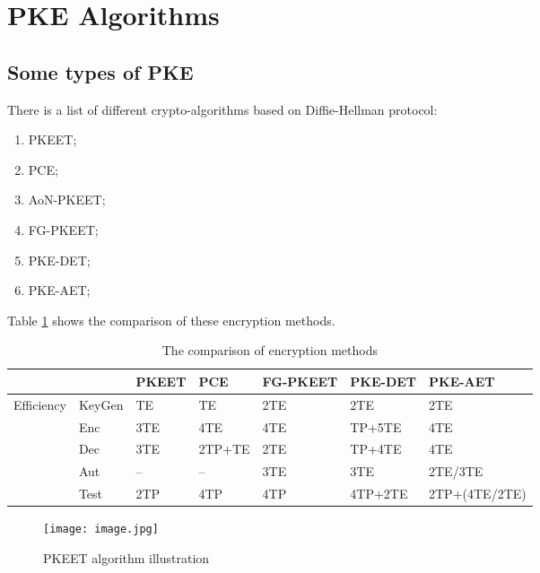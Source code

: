 \documentclass[12pt]{article}
\begin{document}
\tableofcontents
\newpage
\section{PKE Algorithms}
\subsection{Some types of PKE} 
 
 

There is a list of different crypto-algorithms based on Diffie-Hellman protocol:
\newline
\begin{enumerate}
    \item PKEET;
    \item PCE;
    \item AoN-PKEET;
    \item FG-PKEET;
    \item PKE-DET;
    \item PKE-AET;
\end{enumerate}
Table \ref{table 1}  shows the comparison of these encryption methods.
\newline
\begin{table}[h!]
    \begin{center}
        \caption{The comparison of encryption methods}
        \label{table 1}
          \begin{tabular}{|p{1.75cm}|p{2.625cm}|p{1.75cm}|p{1.75cm}|p{1.75cm}|p{1.75cm}|p{3cm}|}
          \hline
            & &PKEET&PCE&FG-PKEET&PKE-DET&PKE-AET\\
          \hline
          Efficiency&KeyGen&TE&TE&2TE&2TE&2TE\\
          \hline
          &Enc&3TE&4TE&4TE&TP+5TE&4TE\\
          \hline
          &Dec&3TE&2TP+TE&2TE&TP+4TE&4TE\\
          \hline
           &Aut& – & – &3TE&3TE&2TE/3TE\\
          \hline
           &Test&2TP&4TP&4TP&4TP+2TE&2TP+(4TE/2TE)\\
           \hline
          \end{tabular}
   \end{center}
\end{table}




\begin{figure}[H]
    \centering
    \texttt{[image: image.jpg]}
    \caption{PKEET algorithm illustration}
    \label{figure1}
\end{figure}
\end{document}
